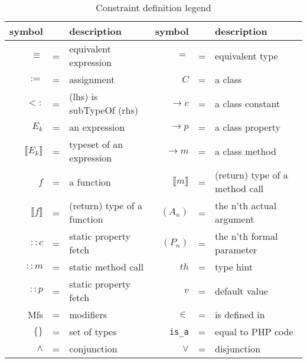 \documentclass[../main.tex]{subfiles}
\begin{document}
    \begin{table}[H]
    	\center
        \begin{tabular}{ r c l | r c l }
        	\toprule
        	symbol & & description &
        	symbol & & description \\
        	\midrule

            $\equiv$ & = & equivalent expression &
            $=$     & = & equivalent type \\

            $:=$    & = & assignment &
            $C$     & = & a class \\

            $<:$    & = & (lhs) is subTypeOf (rhs) &
            $\rightarrow c$     & = & a class constant \\

            $E_k$   & = & an expression &
            $\rightarrow p$     & = & a class property \\

            $\llbracket{}E_k\rrbracket{}$ & = & typeset of an expression &
            $\rightarrow m$     & = & a class method \\

            $f$     & = & a function &
            $\llbracket{}m\rrbracket{}$   & = & (return) type of a method call \\

            $\llbracket{}f\rrbracket{}$   & = & (return) type of a function &
            $(A_n)$ & = & the n'th actual argument \\

            $::c$   & = & static property fetch &
            $(P_n)$ & = & the n'th formal parameter \\

            $::m$   & = & static method call &
            $th$    & = & type hint \\

            $::p$   & = & static property fetch &
            $v$     & = & default value \\

            Mfs     & = & modifiers &
            $\in$ & = & is defined in \\

            $\{ \}$     & = & set of types &
            \texttt{is\_a} & = & equal to PHP code \\

            $\land$ & = & conjunction &
            $\lor$   & = & disjunction

        \end{tabular}
        \caption{Constraint definition legend}
        \label{table:constraintLegend}
   \end{table}
\end{document}
